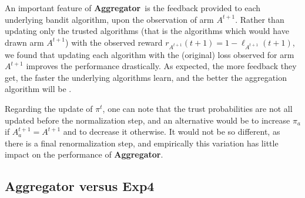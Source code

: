 \documentclass[conference]{IEEEtran}
\theoremstyle{plain}  %
\newcommand{\Aggr}[0]{\textbf{Aggregator}}
\newcommand{\ExpQ}[0]{\textbf{Exp4}}
\begin{document}
%
An important feature of \Aggr \ is the feedback provided to each underlying bandit algorithm, upon the observation of arm $A^{t+1}$. Rather than updating only the trusted algorithms (that is the algorithms which would have drawn arm $A^{t+1}$) with the observed reward $r_{A^{t+1}}(t+1)=1 - \ell_{A^{t+1}}(t+1)$,  we found that updating each algorithm with the (original) loss observed for arm $A^{t+1}$ improves the performance drastically. As expected, the more feedback they get, the faster the underlying algorithms learn, and the better the aggregation algorithm will be \cite{Maillard11}.

Regarding the update of $\pi^t$, one can note that the trust probabilities are not all updated before the normalization step,
and an alternative would be to
increase $\pi_{a}$ if $A^{t+1}_a = A^{t+1}$ and to decrease it otherwise.
It would not be so different, as there is a final renormalization step, and empirically this variation has little impact on the performance of \Aggr{}.
%



\subsection{ \Aggr{} versus \ExpQ{} }\label{sub:Exp4}
\end{document}
